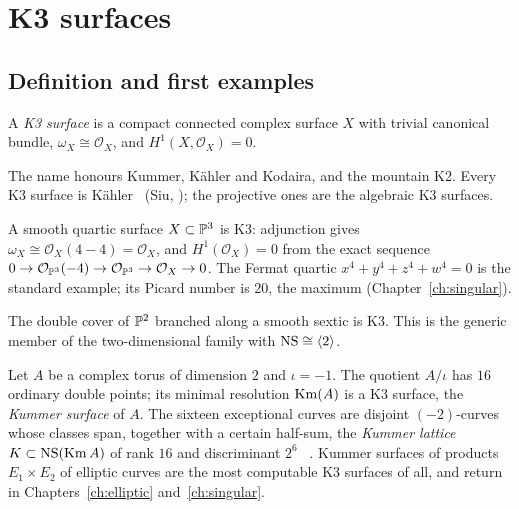 \chapter{K3 surfaces}\label{ch:k3}

\section{Definition and first examples}

\begin{definition}
A \emph{K3 surface} is a compact connected complex surface $X$ with trivial
canonical bundle, $\omega_X\cong\mathcal O_X$, and $H^1(X,\mathcal O_X)=0$.
\end{definition}

The name honours Kummer, K\"ahler and Kodaira, and the mountain K2. Every
K3 surface is K\"ahler \Lstatus~(Siu, \cite[Thm.~7.1.1]{Huybrechts2016}); the
projective ones are the algebraic K3 surfaces.

\begin{example}[quartics]
A smooth quartic surface $X\subset\mathbb{P}^3$ is K3: adjunction gives
$\omega_X\cong\mathcal O_X(4-4)=\mathcal O_X$, and $H^1(\mathcal O_X)=0$ from
the exact sequence $0\to\mathcal O_{\mathbb{P}^3}(-4)\to\mathcal O_{\mathbb{P}^3}\to\mathcal O_X\to0$.
The Fermat quartic $x^4+y^4+z^4+w^4=0$ is the standard example; its Picard
number is $20$, the maximum (Chapter~\ref{ch:singular}).
\end{example}

\begin{example}
The double cover of $\mathbb{P}^2$ branched along a smooth sextic is K3. This is the
generic member of the two-dimensional family with $\operatorname{NS}\cong\langle 2\rangle$.
\end{example}

\begin{example}\label{ex:kummer}
Let $A$ be a complex torus of dimension $2$ and $\iota=-1$. The quotient
$A/\iota$ has $16$ ordinary double points; its minimal resolution
$\operatorname{Km}(A)$ is a K3 surface, the \emph{Kummer surface} of $A$. The sixteen
exceptional curves are disjoint $(-2)$-curves whose classes span, together
with a certain half-sum, the \emph{Kummer lattice} $K\subset\operatorname{NS}(\operatorname{Km} A)$ of rank
$16$ and discriminant $2^6$ \Lstatus~\cite[Ch.~14.3]{Huybrechts2016}. Kummer
surfaces of products $E_1\times E_2$ of elliptic curves are the most
computable K3 surfaces of all, and return in Chapters~\ref{ch:elliptic}
and~\ref{ch:singular}.
\end{example}

